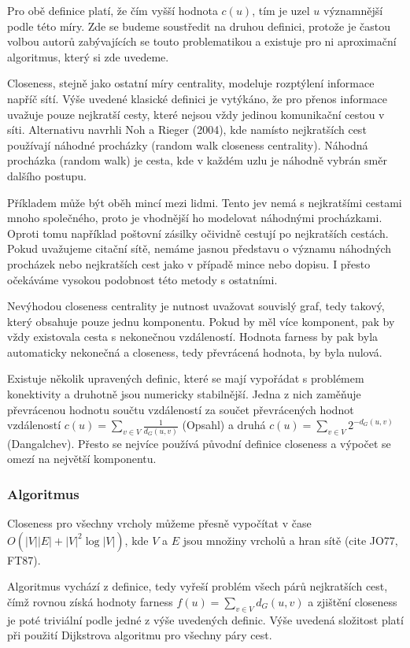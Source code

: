 \documentclass{bakalarka}
\begin{document}
Pro obě definice platí, že čím vyšší hodnota $c(u)$, tím je uzel $u$
významnější podle této míry. Zde se budeme soustředit na druhou definici,
protože je častou volbou autorů zabývajících se touto problematikou a existuje
pro ni aproximační algoritmus, který si zde uvedeme.

Closeness, stejně jako ostatní míry centrality, modeluje rozptýlení informace
napříč sítí. Výše uvedené klasické definici je vytýkáno, že pro přenos
informace uvažuje pouze nejkratší cesty, které nejsou vždy jedinou komunikační
cestou v síti. Alternativu navrhli Noh a Rieger (2004), kde namísto nejkratších
cest používají náhodné procházky (random walk closeness centrality). Náhodná
procházka (random walk) je cesta, kde v každém uzlu je náhodně vybrán směr
dalšího postupu.

Příkladem může být oběh mincí mezi lidmi. Tento jev nemá s nejkratšími cestami
mnoho společného, proto je vhodnější ho modelovat náhodnými procházkami. Oproti
tomu například poštovní zásilky očividně cestují po nejkratších cestách. Pokud
uvažujeme citační sítě, nemáme jasnou představu o významu náhodných procházek
nebo nejkratších cest jako v případě mince nebo dopisu. I přesto očekáváme
vysokou podobnost této metody s ostatními.

Nevýhodou closeness centrality je nutnost uvažovat souvislý graf, tedy takový,
který obsahuje pouze jednu komponentu. Pokud by měl více komponent, pak by vždy
existovala cesta s nekonečnou vzdáleností. Hodnota farness by pak byla
automaticky nekonečná a closeness, tedy převrácená hodnota, by byla nulová. 

Existuje několik upravených definic, které se mají vypořádat s problémem
konektivity a druhotně jsou numericky stabilnější. Jedna z nich zaměňuje
převrácenou hodnotu součtu vzdáleností za součet převrácených hodnot
vzdáleností $c(u) = \sum_{v \in V} \frac{1}{d_G(u, v)}$ (Opsahl) a druhá $c(u)
= \sum_{v \in V} 2^{-d_G(u, v)}$ (Dangalchev). Přesto se nejvíce používá
původní definice closeness a výpočet se omezí na největší komponentu.


\subsubsection{Algoritmus}
Closeness pro všechny vrcholy můžeme přesně vypočítat v čase $O(|V||E| +
|V|^2\log|V|)$, kde $V$ a $E$ jsou množiny vrcholů a hran sítě (cite JO77,
FT87). 

Algoritmus vychází z definice, tedy vyřeší problém všech párů nejkratších cest,
čímž rovnou získá hodnoty farness $f(u) = \sum_{v \in V} d_G(u, v)$ a zjištění
closeness je poté triviální podle jedné z výše uvedených definic.  Výše uvedená
složitost platí při použití Dijkstrova algoritmu pro všechny páry cest.
\end{document}
